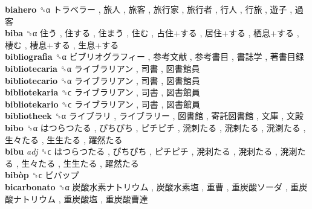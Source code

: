 \textbf{biahero} ␝α   トラベラー ,  旅人 ,  旅客 ,  旅行家 ,  旅行者 ,  行人 ,  行旅 ,  遊子 ,  過客   \\
\textbf{biba} ␝α   住う ,  住する ,  住まう ,  住む ,  占住+する ,  居住+する ,  栖息+する ,  棲む ,  棲息+する ,  生息+する   \\
\textbf{bibliografia} ␝α   ビブリオグラフィー ,  参考文献 ,  参考書目 ,  書誌学 ,  著書目録   \\
\textbf{bibliotecaria} ␝α   ライブラリアン ,  司書 ,  図書館員   \\
\textbf{bibliotecario} ␝α   ライブラリアン ,  司書 ,  図書館員   \\
\textbf{bibliotekaria} ␝ϲ   ライブラリアン ,  司書 ,  図書館員   \\
\textbf{bibliotekario} ␝ϲ   ライブラリアン ,  司書 ,  図書館員   \\
\textbf{bibliotheek} ␝α   ライブラリ ,  ライブラリー ,  図書館 ,  寄託図書館 ,  文庫 ,  文殿   \\
\textbf{bibo} ␝α   はつらつたる ,  ぴちぴち ,  ピチピチ ,  溌刺たる ,  溌剌たる ,  溌溂たる ,  生々たる ,  生生たる ,  躍然たる   \\
\textbf{bibu} \emph{adj}  ␝ϲ   はつらつたる ,  ぴちぴち ,  ピチピチ ,  溌刺たる ,  溌剌たる ,  溌溂たる ,  生々たる ,  生生たる ,  躍然たる   \\
\textbf{bibòp} ␝ϲ   ビバップ   \\
\textbf{bicarbonato} ␝α   炭酸水素ナトリウム ,  炭酸水素塩 ,  重曹 ,  重炭酸ソーダ ,  重炭酸ナトリウム ,  重炭酸塩 ,  重炭酸曹達   \\
